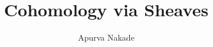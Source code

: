 

\usepackage{pgfplots}
\pgfplotsset{compat=newest}

% 

\title{Cohomology via Sheaves}
\author{\small{Apurva Nakade}}
\date{}










